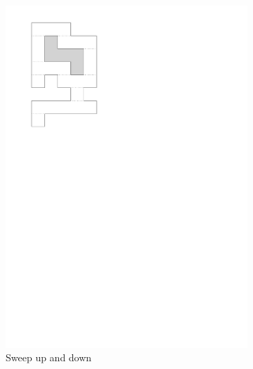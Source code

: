 \documentclass[english,gradu]{tktltiki2018}
\begin{document}
\begin{figure}
\begin{subfigure}[t]{0.15\textwidth}
		\includegraphics[width=\textwidth,page=6]{fig/light2d}
		\caption{Sweep up and down}\label{fig:light2d:updown}
	\end{subfigure}
	\hfil
	\begin{subfigure}[t]{0.15\textwidth}\centering

\end{subfigure}
\end{figure}
\end{document}
